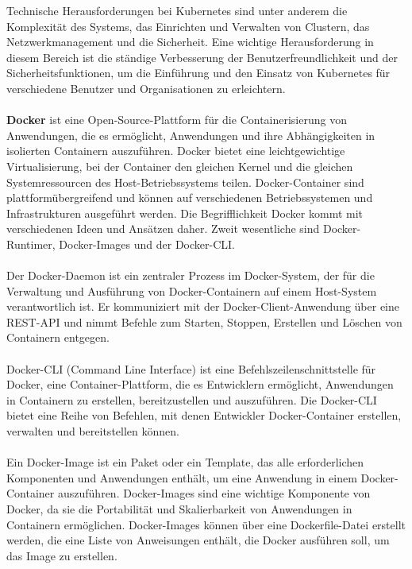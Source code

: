 Technische Herausforderungen bei Kubernetes sind unter anderem die Komplexität des Systems, das Einrichten und Verwalten von Clustern, das Netzwerkmanagement und die Sicherheit. Eine wichtige Herausforderung in diesem Bereich ist die ständige Verbesserung der Benutzerfreundlichkeit und der Sicherheitsfunktionen, um die Einführung und den Einsatz von Kubernetes für verschiedene Benutzer und Organisationen zu erleichtern.
\\\\
\textbf{Docker} ist eine Open-Source-Plattform für die Containerisierung von Anwendungen, die es ermöglicht, Anwendungen und ihre Abhängigkeiten in isolierten Containern auszuführen. Docker bietet eine leichtgewichtige Virtualisierung, bei der Container den gleichen Kernel und die gleichen Systemressourcen des Host-Betriebssystems teilen. Docker-Container sind plattformübergreifend und können auf verschiedenen Betriebssystemen und Infrastrukturen ausgeführt werden. Die Begrifflichkeit Docker kommt mit verschiedenen Ideen und Ansätzen daher. Zweit wesentliche sind Docker-Runtimer, Docker-Images und der Docker-CLI.
\\\\
Der Docker-Daemon ist ein zentraler Prozess im Docker-System, der für die Verwaltung und Ausführung von Docker-Containern auf einem Host-System verantwortlich ist. Er kommuniziert mit der Docker-Client-Anwendung über eine REST-API und nimmt Befehle zum Starten, Stoppen, Erstellen und Löschen von Containern entgegen.
\\\\
Docker-CLI (Command Line Interface) ist eine Befehlszeilenschnittstelle für Docker, eine Container-Plattform, die es Entwicklern ermöglicht, Anwendungen in Containern zu erstellen, bereitzustellen und auszuführen. Die Docker-CLI bietet eine Reihe von Befehlen, mit denen Entwickler Docker-Container erstellen, verwalten und bereitstellen können.
\\\\
Ein Docker-Image ist ein Paket oder ein Template, das alle erforderlichen Komponenten und Anwendungen enthält, um eine Anwendung in einem Docker-Container auszuführen. Docker-Images sind eine wichtige Komponente von Docker, da sie die Portabilität und Skalierbarkeit von Anwendungen in Containern ermöglichen. Docker-Images können über eine Dockerfile-Datei erstellt werden, die eine Liste von Anweisungen enthält, die Docker ausführen soll, um das Image zu erstellen.
\\\\
